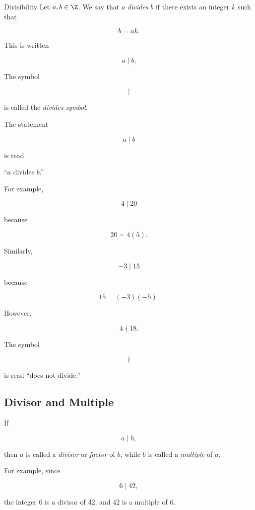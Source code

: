 \begin{definitionbox}{Divisibility}
Let \(a,b\in\Z\). We say that \(a\) \emph{divides} \(b\) if there exists an
integer \(k\) such that

\[ b=ak. \]

This is written

\[ a\mid b. \]
\end{definitionbox}

The symbol

\[ \mid \]

is called the \emph{divides symbol}.

The statement

\[ a\mid b \]

is read

\begin{center}
``\(a\) divides \(b\).''
\end{center}

For example,

\[ 4\mid20 \]

because

\[ 20=4(5). \]

Similarly,

\[ -3\mid15 \]

because

\[ 15=(-3)(-5). \]

However,

\[ 4\nmid18. \]

The symbol

\[ \nmid \]

is read ``does not divide.''

\subsection{Divisor and Multiple}
\label{subsec:divisor-multiple}

If

\[ a\mid b, \]

then \(a\) is called a \emph{divisor} or \emph{factor} of \(b\), while \(b\)
is called a \emph{multiple} of \(a\).

For example, since

\[ 6\mid42, \]

the integer \(6\) is a divisor of \(42\), and \(42\) is a multiple of \(6\).

